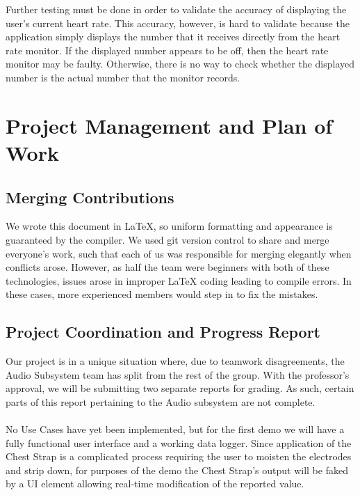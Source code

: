 \documentclass[letterpaper,english, 12pt]{scrreprt}
\begin{document}
Further testing must be done in order to validate the accuracy of displaying the user's current heart rate. This accuracy, however, is hard to validate because the application simply displays the number that it receives directly from the heart rate monitor. If the displayed number appears to be off, then the heart rate monitor may be faulty. Otherwise, there is no way to check whether the displayed number is the actual number that the monitor records.

\chapter{Project Management and Plan of Work}
\section{Merging Contributions}
We wrote this document in \LaTeX, so uniform formatting and appearance is guaranteed by the compiler.
We used git version control to share and merge everyone's work, such that each of us was responsible for merging elegantly when conflicts arose.
However, as half the team were beginners with both of these technologies, issues arose in improper LaTeX coding leading to compile errors.
In these cases, more experienced members would step in to fix the mistakes.

\section{Project Coordination and Progress Report}
Our project is in a unique situation where, due to teamwork disagreements, the Audio Subsystem team has split from the rest of the group.
With the professor's approval, we will be submitting two separate reports for grading.
As such, certain parts of this report pertaining to the Audio subsystem are not complete.
\\
\\
No Use Cases have yet been implemented, but for the first demo we will have a fully functional user interface and a working data logger.
Since application of the Chest Strap is a complicated process requiring the user to moisten the electrodes and strip down, for purposes of the demo the Chest Strap's output will be faked by a UI element allowing real-time modification of the reported value.
\end{document}

